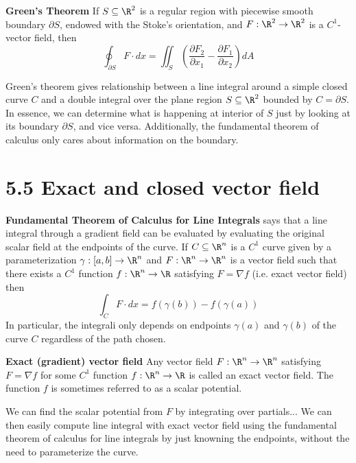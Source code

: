 \documentclass[11pt]{article}
\begin{document}
\begin{theorem*}
  \textbf{Green's Theorem} If $S\subseteq\R^2$ is a regular region with piecewise smooth boundary $\partial S$, endowed with the Stoke's orientation, and $F:\R^2\to\R^2$ is a $C^1$-vector field, then
  \[
    \oint_{\partial S} F\cdot dx = \iint_S \left( \frac{\partial F_2}{\partial x_1} - \frac{\partial F_1}{\partial x_2} \right)dA
  \]
  \begin{rem}
    Green's theorem gives relationship between a line integral around a simple closed curve $C$ and a double integral over the plane region $S \subseteq \R^2$ bounded by $C = \partial S$. In essence, we can determine what is happening at interior of $S$ just by looking at its boundary $\partial S$, and vice versa. Additionally, the fundamental theorem of calculus only cares about information on the boundary.
  \end{rem}
\end{theorem*}


\section*{5.5 Exact and closed vector field}

\begin{theorem*}
  \textbf{Fundamental Theorem of Calculus for Line Integrals} says that a line integral through a gradient field can be evaluated by evaluating the original scalar field at the endpoints of the curve. If $C\subseteq\R^n$ is a $C^1$ curve given by a parameterization $\gamma: [a,b]\to\R^n$ and $F:\R^n\to\R^n$ is a vector field such that there exists a $C^1$ function $f:\R^n \to\R$ satisfying $F = \nabla f$ (i.e. exact vector field) then
  \[
    \int_C F\cdot dx = f(\gamma(b)) - f(\gamma(a))
  \]
  In particular, the integrali only depends on endpoints $\gamma(a)$ and $\gamma(b)$ of the curve $C$ regardless of the path chosen.
\end{theorem*}


\begin{defn*}
  \textbf{Exact (gradient) vector field} Any vector field $F:\R^n \to \R^n$ satisfying $F = \nabla f$ for some $C^1$ function $f:\R^n\to\R$ is called an exact vector field. The function $f$ is sometimes referred to as a scalar potential.
  \begin{rem}
    We can find the scalar potential from $F$ by integrating over partials... We can then easily compute line integral with exact vector field using the fundamental theorem of calculus for line integrals by just knowning the endpoints, without the need to parameterize the curve.
  \end{rem}
\end{defn*}
\end{document}
